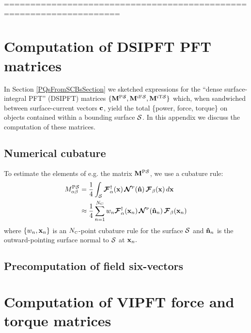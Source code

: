 \documentclass[letterpaper]{article}
\newcommand{\PS}{^{\text{\scriptsize P}\mc S}}
\newcommand{\IFS}{^{i\text{\scriptsize F}\mc S}}
\newcommand{\ITS}{^{i\text{\scriptsize T}\mc S}}
\begin{document}
====================================================================%
\newpage
\appendix
\section{Computation of DSIPFT PFT matrices}

In Section \ref{PQsFromSCBsSection} we sketched expressions for
the ``dense surface-integral PFT'' (DSIPFT)
matrices $\{\vb M\PS, \vb M\IFS, \vb M\ITS\}$ which, when sandwiched
between surface-current vectors $\mathbf{c}$, yield the total
\{power, force, torque\} on objects contained within a bounding
surface $\mathcal{S}$. In this appendix we discuss the computation of 
these matrices.

\subsection{Numerical cubature}

To estimate the elements of e.g. the matrix $\vb M\PS$, we
use a cubature rule:
\begin{align}
  M_{\alpha\beta}\PS
 &= \frac{1}{4} \int_{\mc S} 
    \bmc F^\dagger_\alpha(\vb x) 
    \,
    \bmc N\supt{P}(\vbhat{n})
    \,
    \bmc F_\beta(\vb x) 
     \, d\vb x
\nn
 &\approx \frac{1}{4} \sum_{n=1}^{N\subt{C}} w_n 
    \bmc F^\dagger_\alpha(\vb x_n) 
    \,
    \bmc N\supt{P}(\vbhat{n}_n)
    \,
    \bmc F_\beta(\vb x_n) 
\label{MPSCubature}
\end{align}
where $\{w_n, \mathbf{x}_n\}$ is an $N_{\hbox{\tiny{C}}}$-point cubature rule 
for the surface $\mathcal{S}$ and $\mathbf{\hat n}_n$ is the outward-pointing
surface normal to $\mathcal{S}$ at $\mathbf{x}_n.$
 
\subsection{Precomputation of field six-vectors}

\section{Computation of VIPFT force and torque matrices}
\end{document}
